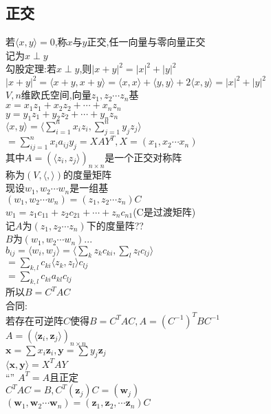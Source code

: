 \documentclass[11pt, a4paper, UTF8]{ctexart}
\begin{document}
\subsection{正交}
若$\langle x,y\rangle=0$,称$x$与$y$正交,任一向量与零向量正交\\
记为$x\perp y$\\
勾股定理:若$x\perp y$,则$|x+y|^2=|x|^2+|y|^2$\\
$|x+y|^2=\langle x+y,x+y\rangle=\langle x,x\rangle+\langle y,y\rangle+2\langle x,y\rangle=|x|^2+|y|^2$\\
$V,n$维欧氏空间,向量$z_1,z_2\cdots z_n$基\\
$x=x_1z_1+x_2z_2+\cdots+x_nz_n$\\
$y=y_1z_1+y_2z_2+\cdots+y_nz_n$\\
$\langle x,y\rangle=\langle\sum\limits_{i=1}^nx_iz_i,\sum\limits_{j=1}^ny_jz_j\rangle$\\
$=\sum\limits_{ij=1}^nx_ia_{ij}y_j=XAY^T,X=(x_1,x_2\cdots x_n)$\\
其中$A=(\langle z_i,z_j\rangle)_{n\times n}$是一个正交对称阵\\
称为$(V,\langle,\rangle)$的度量矩阵\\
现设$w_1,w_2\cdots w_n$是一组基\\
$(w_1,w_2\cdots w_n)=(z_1,z_2\cdots z_n)C$\\
$w_1=z_1c_{11}+z_2c_{21}+\cdots+z_nc_{n1}$(C是过渡矩阵)\\
记$A$为$(z_1,z_2\cdots z_n)$下的度量阵??\\
$B$为$(w_1,w_2\cdots w_n)$...\\
$b_{ij}=\langle w_i,w_j\rangle=\langle\sum\limits_kz_kc_{ki},\sum\limits_lz_lc_{lj}\rangle$\\
$=\sum\limits_{k,l}c_{ki}\langle z_k,z_l\rangle c_{lj}$\\
$=\sum\limits_{k,l}c_{ki}a_{kl}c_{lj}$\\
所以$B=C^TAC$\\
合同:\\
若存在可逆阵$C$使得$B=C^TAC,A=(C^{-1})^TBC^{-1}$\\
$A=(\langle\bm z_i,\bm z_j\rangle)_{n\times n}$\\
$\bm x=\sum x_i\bm z_i,\bm y=\sum y_j\bm z_j$\\
$\langle\bm x,\bm y\rangle=X^TAY$\\``''
$A^T=A$且正定\\
$C^TAC=B,C^T(\bm z_j)C=(\bm w_j)$\\
$(\bm w_1,\bm w_2\cdots\bm w_n)=(\bm z_1,\bm z_2,\cdots\bm z_n)C$\\
\end{document}
